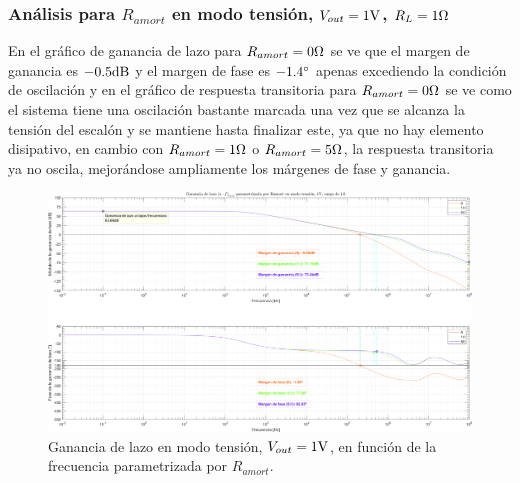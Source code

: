 \clearpage


\subsubsection{Análisis para $R_{amort}$ en modo tensión, $V_{out} = 1 \si[per-mode=symbol]{\volt}$, $R_{L} = 1 \si[per-mode=symbol]{\ohm}$}

En el gráfico de ganancia de lazo para $R_{amort} = 0 \si[per-mode=symbol]{\ohm} $ se ve que el margen de ganancia es $-0.5 \si[per-mode=symbol]{\decibel} $ y el margen de fase es $-1.4 \si[per-mode=symbol]{\degree} $ apenas excediendo  la condición de oscilación  y en el gráfico de respuesta transitoria para $R_{amort} = 0 \si[per-mode=symbol]{\ohm} $ se ve como el sistema tiene una oscilación bastante marcada  una vez que se alcanza la tensión del escalón y se mantiene hasta finalizar este, ya que no hay elemento disipativo, en cambio con $R_{amort} = 1 \si[per-mode=symbol]{\ohm} $ o $R_{amort} = 5 \si[per-mode=symbol]{\ohm} $, la respuesta transitoria ya no oscila, mejorándose ampliamente los márgenes de fase y ganancia.





\clearpage

\begin{figure}[H] %
\begin{center}
\includegraphics[width=1.1 \textwidth, angle=90]{./img/plots/loop/power_supply_RAMORT_LOOP_Modo2.png}
\caption{\label{fig:fig_power_supply_RAMORT_LOOP_Modo2}\footnotesize{Ganancia de lazo en modo tensión, $V_{out} = 1 \si[per-mode=symbol]{\volt}$, en función de la frecuencia parametrizada por $R_{amort}$.}}
\end{center}
\end{figure}


